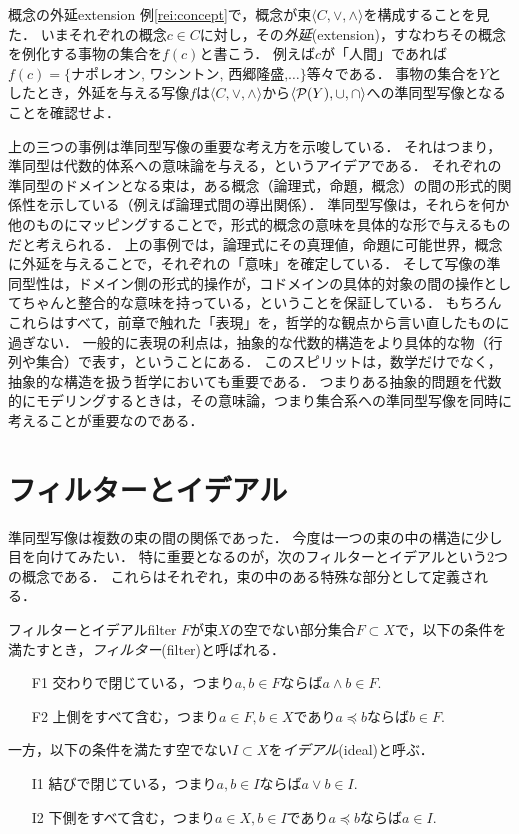 \documentclass[11pt,a4paper, dvipdfmx]{jsarticle}
\begin{document}
\begin{rei}{概念の外延}{extension}
例\ref{rei:concept}で，概念が束$\langle C, \vee, \wedge \rangle$を構成することを見た．
いまそれぞれの概念$c \in C$に対し，その\emph{外延}(extension)，すなわちその概念を例化する事物の集合を$f(c)$と書こう．
例えば$c$が「人間」であれば$f(c)=\{\text{ナポレオン, ワシントン, 西郷隆盛,}\dots\}$等々である．
事物の集合を$Y$としたとき，外延を与える写像$f$は$\langle C, \vee, \wedge \rangle$から$\langle \mathcal{P}(Y), \cup, \cap \rangle$への準同型写像となることを確認せよ．
\end{rei}

上の三つの事例は準同型写像の重要な考え方を示唆している．
それはつまり，準同型は代数的体系への意味論を与える，というアイデアである．
それぞれの準同型のドメインとなる束は，ある概念（論理式，命題，概念）の間の形式的関係性を示している（例えば論理式間の導出関係）．
準同型写像は，それらを何か他のものにマッピングすることで，形式的概念の意味を具体的な形で与えるものだと考えられる．
上の事例では，論理式にその真理値，命題に可能世界，概念に外延を与えることで，それぞれの「意味」を確定している．
そして写像の準同型性は，ドメイン側の形式的操作が，コドメインの具体的対象の間の操作としてちゃんと整合的な意味を持っている，ということを保証している．
もちろんこれらはすべて，前章で触れた「表現」を，哲学的な観点から言い直したものに過ぎない．
一般的に表現の利点は，抽象的な代数的構造をより具体的な物（行列や集合）で表す，ということにある．
このスピリットは，数学だけでなく，抽象的な構造を扱う哲学においても重要である．
つまりある抽象的問題を代数的にモデリングするときは，その意味論，つまり集合系への準同型写像を同時に考えることが重要なのである．



\section{フィルターとイデアル}
準同型写像は複数の束の間の関係であった．
今度は一つの束の中の構造に少し目を向けてみたい．
特に重要となるのが，次のフィルターとイデアルという2つの概念である．
これらはそれぞれ，束の中のある特殊な部分として定義される．
\begin{dfn}{フィルターとイデアル}{filter}
$F$が束$X$の空でない部分集合$F \subset X$で，以下の条件を満たすとき，\emph{フィルター}(filter)と呼ばれる．
\begin{enumerate}
    \item[F1] 交わりで閉じている，つまり$a, b \in F$ならば$a \wedge b \in F$.
    \item[F2] 上側をすべて含む，つまり$a \in F, b \in X$であり$a \preceq b$ならば$b \in F$.
\end{enumerate}
一方，以下の条件を満たす空でない$I \subset X$を\emph{イデアル}(ideal)と呼ぶ．
\begin{enumerate}
    \item[I1] 結びで閉じている，つまり$a, b \in I$ならば$a \vee b \in I$.
    \item[I2] 下側をすべて含む，つまり$a \in X, b \in I$であり$a \preceq b$ならば$a \in I$.
\end{enumerate}
\end{dfn}
\end{document}
